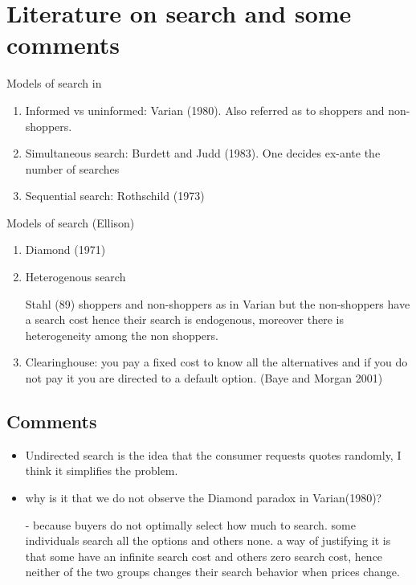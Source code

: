 \documentclass[12pt]{article}
\theoremstyle{plain}
\theoremstyle{plain}
\begin{document}
 
\section*{Literature on search and some comments}

Models of search in \textcite{gavazza_frictions_2021}
\begin{enumerate}
    \item Informed vs uninformed: Varian (1980). Also referred as to shoppers and non-shoppers. 
    \item Simultaneous search:  Burdett and Judd (1983). One decides ex-ante the number of searches 
    \item Sequential search: Rothschild (1973) 
\end{enumerate}


Models of search (Ellison) 
\begin{enumerate}
    \item Diamond (1971)
    \item Heterogenous search
    
    Stahl (89) shoppers and non-shoppers as in Varian but the non-shoppers have a search cost hence their search is endogenous, moreover there is heterogeneity among the non shoppers. 

    \item Clearinghouse: you pay a fixed cost to know all the alternatives and if you do not pay it you are directed to a default option. (Baye and Morgan 2001)

\end{enumerate}


\subsection*{Comments}
\begin{itemize}
    \item Undirected search is the idea that the consumer requests quotes randomly, I think it simplifies the problem. 
    
    \item why is it that we do not observe the Diamond paradox in Varian(1980)? 
    
    - because buyers do not optimally select how much to search. some individuals search all the options and others none. a way of justifying it is that some have an infinite search cost and others zero search cost, hence neither of the two groups changes their search behavior when prices change. 
\end{itemize}
\end{document}
